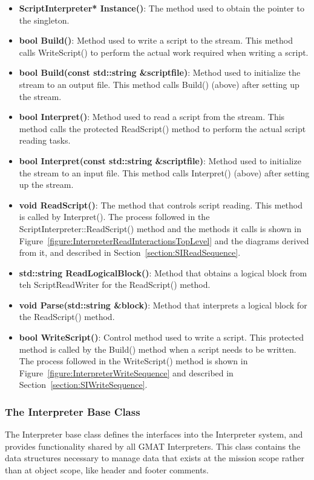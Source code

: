 \begin{itemize}
\item \textbf{ScriptInterpreter* Instance()}: The method used to obtain the pointer to the
singleton.
\item \textbf{bool Build()}: Method used to write a script to the stream.  This method calls
WriteScript() to perform the actual work required when writing a script.
\item \textbf{bool Build(const std::string \&scriptfile)}:  Method used to initialize the stream to
an output file.  This method calls Build() (above) after setting up the stream.
\item \textbf{bool Interpret()}: Method used to read a script from the stream.  This method calls
the protected ReadScript() method to perform the actual script reading tasks.
\item \textbf{bool Interpret(const std::string \&scriptfile)}:  Method used to initialize the stream
to an input file.  This method calls Interpret() (above) after setting up the stream.
\item \textbf{void ReadScript()}: The method that controls script reading.  This method is called by
Interpret().  The process followed in the ScriptInterpreter::ReadScript() method and the methods it
calls is shown in Figure~\ref{figure:InterpreterReadInteractionsTopLevel} and the diagrams derived
from it, and described in Section~\ref{section:SIReadSequence}.
\item \textbf{std::string ReadLogicalBlock()}: Method that obtains a logical block from teh
ScriptReadWriter for the ReadScript() method.
\item \textbf{void Parse(std::string \&block)}: Method that interprets a logical block for the
ReadScript() method.
\item \textbf{bool WriteScript()}: Control method used to write a script.  This protected method is
called by the Build() method when a script needs to be written.  The process followed in
the WriteScript() method is shown in Figure~\ref{figure:InterpreterWriteSequence} and
described in Section~\ref{section:SIWriteSequence}.
\end{itemize}

\subsubsection{\label{section:InterpreterBaseClass}The Interpreter Base Class}

The Interpreter base class defines the interfaces into the Interpreter system, and provides
functionality shared by all GMAT Interpreters. This class contains the data structures necessary to
manage data that exists at the mission scope rather than at object scope, like header and footer
comments.

